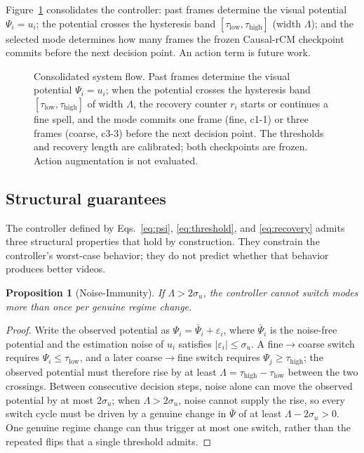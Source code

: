 \documentclass[11pt,a4paper]{article}
\newtheorem{proposition}{Proposition}
\begin{document}
Figure~\ref{fig:systemflow} consolidates the controller: past frames determine the visual potential $\Psi_i=u_i$; the potential crosses the hysteresis band $[\tau_{\mathrm{low}}, \tau_{\mathrm{high}}]$ (width $\Lambda$); and the selected mode determines how many frames the frozen Causal-rCM checkpoint commits before the next decision point. An action term is future work.

\begin{figure}[t]
\centering

\caption{Consolidated system flow. Past frames determine the visual potential $\Psi_i=u_i$; when the potential crosses the hysteresis band $[\tau_{\mathrm{low}}, \tau_{\mathrm{high}}]$ of width $\Lambda$, the recovery counter $r_i$ starts or continues a fine spell, and the mode commits one frame (fine, c1-1) or three frames (coarse, c3-3) before the next decision point. The thresholds and recovery length are calibrated; both checkpoints are frozen. Action augmentation is not evaluated.}
\label{fig:systemflow}
\end{figure}

\subsection{Structural guarantees}\label{sec:guarantees}

The controller defined by Eqs.~\eqref{eq:psi}, \eqref{eq:threshold}, and \eqref{eq:recovery} admits three structural properties that hold by construction. They constrain the controller's worst-case behavior; they do not predict whether that behavior produces better videos.

\begin{proposition}[Noise-Immunity]\label{prop:noise}
If $\Lambda > 2\sigma_u$, the controller cannot switch modes more than once per genuine regime change.
\end{proposition}
\begin{proof}
Write the observed potential as $\Psi_i = \bar{\Psi}_i + \varepsilon_i$, where $\bar{\Psi}_i$ is the noise-free potential and the estimation noise of $u_i$ satisfies $|\varepsilon_i| \le \sigma_u$. A fine$\to$coarse switch requires $\Psi_i \le \tau_{\mathrm{low}}$, and a later coarse$\to$fine switch requires $\Psi_j \ge \tau_{\mathrm{high}}$; the observed potential must therefore rise by at least $\Lambda = \tau_{\mathrm{high}} - \tau_{\mathrm{low}}$ between the two crossings. Between consecutive decision steps, noise alone can move the observed potential by at most $2\sigma_u$; when $\Lambda > 2\sigma_u$, noise cannot supply the rise, so every switch cycle must be driven by a genuine change in $\bar{\Psi}$ of at least $\Lambda - 2\sigma_u > 0$. One genuine regime change can thus trigger at most one switch, rather than the repeated flips that a single threshold admits.
\end{proof}
\end{document}
